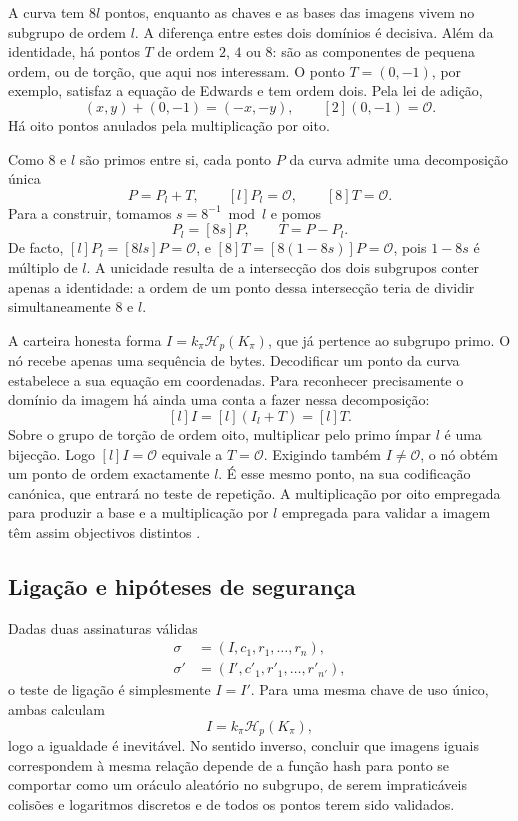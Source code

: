 A curva tem \(8l\) pontos, enquanto as chaves e as bases das imagens vivem
no subgrupo de ordem \(l\). A diferença entre estes dois domínios é
decisiva. Além da identidade, há pontos \(T\) de ordem \(2\), \(4\) ou \(8\):
são as componentes de pequena ordem, ou de torção, que aqui nos interessam.
O ponto \(T=(0,-1)\), por exemplo, satisfaz a equação de Edwards e tem
ordem dois. Pela lei de adição,
\[
 (x,y)+(0,-1)=(-x,-y),\qquad [2](0,-1)=\mathcal O.
\]
Há oito pontos anulados pela multiplicação por oito.

Como \(8\) e \(l\) são primos entre si, cada ponto \(P\) da curva admite
uma decomposição única
\[
 P=P_l+T,\qquad [l]P_l=\mathcal O,\qquad [8]T=\mathcal O.
\]
Para a construir, tomamos \(s=8^{-1}\bmod l\) e pomos
\[
 P_l=[8s]P,\qquad T=P-P_l.
\]
De facto, \([l]P_l=[8ls]P=\mathcal O\), e
\([8]T=[8(1-8s)]P=\mathcal O\), pois \(1-8s\) é múltiplo de \(l\).
A unicidade resulta de a intersecção dos dois subgrupos conter apenas a
identidade: a ordem de um ponto dessa intersecção teria de dividir
simultaneamente \(8\) e \(l\).

A carteira honesta forma \(I=k_\pi\mathcal H_p(K_\pi)\), que já
pertence ao subgrupo primo. O nó recebe apenas uma sequência de bytes.
Decodificar um ponto da curva estabelece a sua equação em coordenadas.
Para reconhecer precisamente o domínio da imagem há ainda uma conta
a fazer nessa decomposição:
\[
               [l]I=[l](I_l+T)=[l]T .
\]
Sobre o grupo de torção de ordem oito, multiplicar pelo primo ímpar
\(l\) é uma bijecção. Logo \([l]I=\mathcal O\) equivale a \(T=\mathcal O\).
Exigindo também \(I\ne\mathcal O\), o nó obtém um ponto de ordem
exactamente \(l\). É esse mesmo ponto, na sua codificação canónica,
que entrará no teste de repetição. A multiplicação por oito empregada
para produzir a base e a multiplicação por \(l\) empregada para
validar a imagem têm assim objectivos distintos
\cite{key-image-bug,monero-source-v16}.

\subsection*{Ligação e hipóteses de segurança}

Dadas duas assinaturas válidas
\begin{align*}
\sigma&=(I,c_1,r_1,\ldots,r_n),\\
\sigma'&=(I',c'_1,r'_1,\ldots,r'_{n'}),
\end{align*}
o teste de ligação é simplesmente \(I=I'\). Para uma mesma chave de uso único,
ambas calculam
\[
I=k_\pi\mathcal H_p(K_\pi),
\]
logo a igualdade é inevitável. No sentido inverso, concluir que imagens
iguais correspondem à mesma relação depende de a função hash para ponto se
comportar como um oráculo aleatório no subgrupo, de serem impraticáveis
colisões e logaritmos discretos e de todos os pontos terem sido validados.


